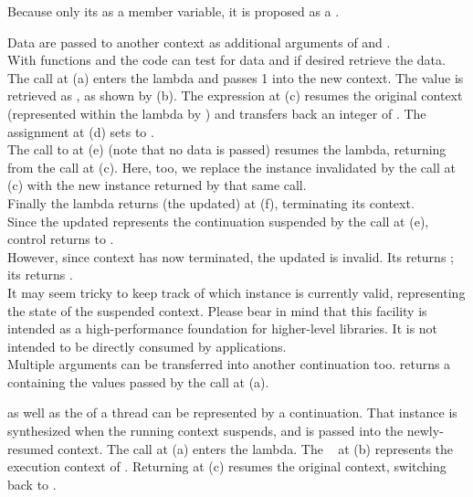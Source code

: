 \label{design}

Because \cont {} only its
 as a member variable, it is proposed as a
.


\label{subsec:data}

Data are passed to another context as additional arguments of \call and
\op.\\
With functions \davail and \dget the code can test for data and if desired
retrieve the data.
The  call at (a) enters the lambda and passes 1 into the
new context. The value is retrieved as , as shown by (b). The expression
 at (c) resumes the original context (represented
within the lambda by ) and transfers back an integer of .
The assignment at (d) sets  to .\\
The call to  at (e) (note that no data is passed) resumes the
lambda, returning from the  call at (c). Here, too,
we replace the \cont instance  invalidated by the \op call at (c)
with the new instance returned by that same \op call.\\
Finally the lambda returns (the updated)  at (f), terminating its
context.\\
Since the updated  represents the continuation suspended by the call at
(e), control returns to \main.\\
However, since context  has now terminated, the updated  is
invalid. Its \opbool returns ; its  returns
.\\
It may seem tricky to keep track of which \cont instance is currently valid,
representing the state of the suspended context. Please bear in mind that this
facility is intended as a high-performance foundation for higher-level
libraries. It is not intended to be directly consumed by applications.\\
Multiple arguments can be transferred into another continuation too.
 returns a 
containing the values passed by the \call call at (a).


\label{subsec:main}

\main as well as the \entryfn of a thread can be represented by a continuation.
That \cont instance is synthesized when the running context suspends, and is
passed into the newly-resumed context.
The  call at (a) enters the lambda. The \cont\  at (b)
represents the execution context of \main. Returning  at (c) resumes the
original context, switching back to \main.


